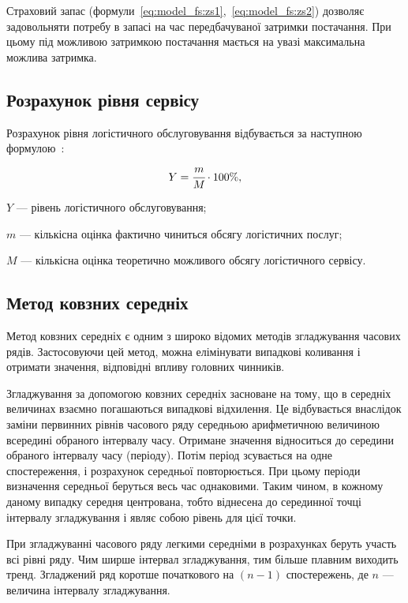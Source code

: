 Страховий запас (формули~\ref{eq:model_fs:zs1},~\ref{eq:model_fs:zs2}) дозволяє задовольняти потребу в запасі на час передбачуваної затримки постачання.
При цьому під можливою затримкою постачання мається на увазі максимальна можлива затримка.

\subsection{Розрахунок рівня сервісу}
Розрахунок рівня логістичного обслуговування відбувається за наступною формулою~\cite{Sterligova2008}:
\begin{equation}
Y=\cfrac{m}{M} \cdot 100\%
,
\end{equation}
\begin{description}
	\item[де] $Y$ --- рівень логістичного обслуговування;
	\item $m$ --- кількісна оцінка фактично чиниться обсягу логістичних послуг;
	\item $M$ --- кількісна оцінка теоретично можливого обсягу логістичного сервісу.
\end{description}

\subsection{Метод ковзних середніх}
Метод ковзних середніх є одним з широко відомих методів згладжування часових рядів. Застосовуючи цей метод, можна елімінувати випадкові коливання і отримати значення, відповідні впливу головних чинників.

Згладжування за допомогою ковзних середніх засноване на тому, що в середніх величинах взаємно погашаються випадкові відхилення. Це відбувається внаслідок заміни первинних рівнів часового ряду середньою арифметичною величиною всередині обраного інтервалу часу. Отримане значення відноситься до середини обраного інтервалу часу (періоду).
Потім період зсувається на одне спостереження, і розрахунок середньої повторюється. При цьому періоди визначення середньої беруться весь час однаковими. Таким чином, в кожному даному випадку середня центрована, тобто віднесена до серединної точці інтервалу згладжування і являє собою рівень для цієї точки.

При згладжуванні часового ряду легкими середніми в розрахунках беруть участь всі рівні ряду. Чим ширше інтервал згладжування, тим більше плавним виходить тренд. Згладжений ряд коротше початкового на $(n-1)$ спостережень, де $n$ --- величина інтервалу згладжування.

